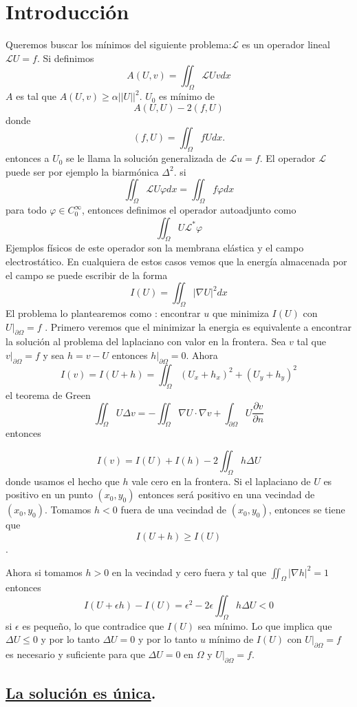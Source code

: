 \documentclass[a4paper,10pt]{book}
\begin{document}
\section{Introducci\'on}
Queremos buscar los m\'inimos del siguiente problema:$\mathscr{L}$ es un operador lineal
$\mathscr{L} U=f$.   Si definimos
\[A(U,v)=\iint_{\Omega} \mathscr{L} U v dx \] 
$A$ es tal que $A(U,v)\geq \alpha {|| U ||}^2$.  $U_0$ es m\'inimo de 
\[A(U,U)-2 (f,U) \]
donde 
\[(f,U)=\iint_{\Omega} f U dx.\]
entonces a $U_0$ se le llama la soluci\'on generalizada de $\mathscr{L} u=f$. El operador $\mathscr{L}$ puede ser 
por ejemplo la  biarm\'onica $\Delta^2$.
si
\[\iint_{\Omega} \mathscr{L} U\varphi dx =\iint_{\Omega} f \varphi dx  \]
para todo $\varphi \in C_0^\infty$, entonces definimos el operador autoadjunto como 
\[\iint_{\Omega} U \mathscr{L}^{*} \varphi \]
Ejemplos f\'isicos de este operador son 
la membrana el\'astica y el campo electrost\'atico. En cualquiera de estos casos
vemos que la energ\'ia almacenada por el campo se puede escribir de la forma
\[I(U)=\iint_{\Omega} |\nabla U |^2 dx \]
El problema lo plantearemos como : encontrar $u$  que minimiza $I(U)$ con $U|_{\partial \Omega}=f$ .
Primero veremos que el minimizar la energia es equivalente a encontrar la soluci\'on al problema 
del laplaciano con valor en la frontera. Sea $v$ tal que $v|_{\partial \Omega}=f$ y sea
$h=v-U$ entonces $h|_{\partial \Omega}=0$. Ahora
\[I(v)= I(U+h)=  \iint_{\Omega} (U_x +h_x)^2+(U_y+h_y)^2  \]
el teorema de Green 
\[
\iint_\Omega U\Delta v = - \iint_\Omega \nabla U \cdot \nabla v + \int_{\partial \Omega} U \frac{\partial v}{\partial n}
\]
entonces

\[I(v)=I(U)+I(h)-2\iint_{\Omega} h \Delta U  \] 
donde usamos el hecho que $h$ vale cero en la frontera. Si el laplaciano de $U$ es positivo en un punto $(x_0,y_0)$
entonces ser\'a positivo en una vecindad de $(x_0,y_0)$.  Tomamos $h<0$ fuera de una vecindad de $(x_0,y_0)$, entonces se tiene que 
\[I(U+h)\geq I(U)\].

Ahora si tomamos
$h>0$ en la vecindad y cero fuera y tal que $\iint_{\Omega} |\nabla h|^2 =1$   entonces
\[I(U+\epsilon h)-I(U)= \epsilon^2-2\epsilon \iint_{\Omega} h \Delta U <0\]
si $ \epsilon$ es peque\~no, lo que contradice que $I(U)$ sea m\'inimo. Lo que implica que
$\Delta U\leq 0$ y por lo tanto $\Delta U=0$ y por lo tanto $u$ m\'inimo de $I(U)$  con $U|_{\partial \Omega} =f$ es necesario
y suficiente para que $\Delta U=0$ en $\Omega$ y $U|_{\partial \Omega}=f$.

\subsection*{\underline{La soluci\'on es \'unica}.}
\end{document}
